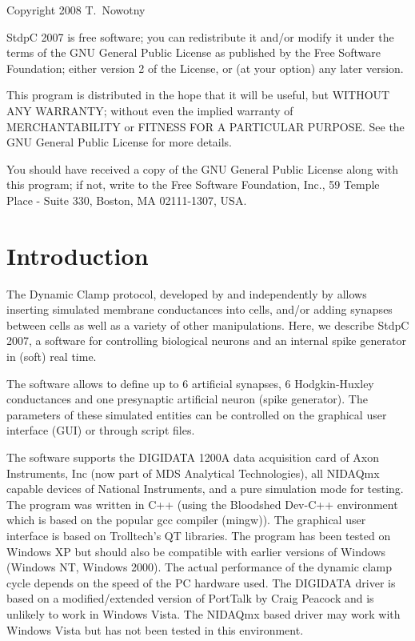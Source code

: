 \documentclass{article}
\begin{document}
Copyright 2008 T.~Nowotny

StdpC 2007 is free software; you can redistribute it and/or modify  
it under the terms of the GNU General Public License as published by 
the Free Software Foundation; either version 2 of the License, or 
(at your option) any later version.                               

This program is distributed in the hope that it will be useful,
but WITHOUT ANY WARRANTY; without even the implied warranty of
MERCHANTABILITY or FITNESS FOR A PARTICULAR PURPOSE.  See the 
GNU General Public License for more details.

You should have received a copy of the GNU General Public License
along with this program; if not, write to the
Free Software Foundation, Inc., 59 Temple Place - Suite 330, Boston,
MA  02111-1307, USA.

\newpage
\section{Introduction}
           
The Dynamic Clamp protocol, developed by \cite{Sharp1993} and
independently by \cite{Robinson1993} allows inserting simulated
membrane conductances into cells, and/or adding synapses between cells
as well as a variety of other manipulations. Here, we describe StdpC
2007, a software for controlling biological neurons and an internal
spike generator in (soft) real time.

The software allows to define up to $6$ artificial synapses, $6$
Hodgkin-Huxley conductances \cite{Hodgkin1949} and one presynaptic
artificial neuron (spike generator). The parameters of these simulated
entities can be controlled on the graphical user interface (GUI) or
through script files.  
 
The software supports the DIGIDATA 1200A data acquisition card of Axon
Instruments, Inc (now part of MDS Analytical Technologies), all
NIDAQmx capable devices of National Instruments, and a pure simulation
mode for testing. The program was written in C++ (using the Bloodshed
Dev-C++ environment which is based on the popular gcc compiler
(mingw)). The graphical user interface is based on Trolltech's QT
libraries. The program has been tested on Windows XP but should also
be compatible with earlier versions of Windows (Windows NT, Windows
2000). The actual performance of the dynamic clamp cycle depends
on the speed of the PC hardware used. The DIGIDATA driver is
based on a modified/extended version of PortTalk by Craig Peacock and
is unlikely to work in Windows Vista. The NIDAQmx based driver may
work with Windows Vista but has not been tested in this environment.
\end{document}
